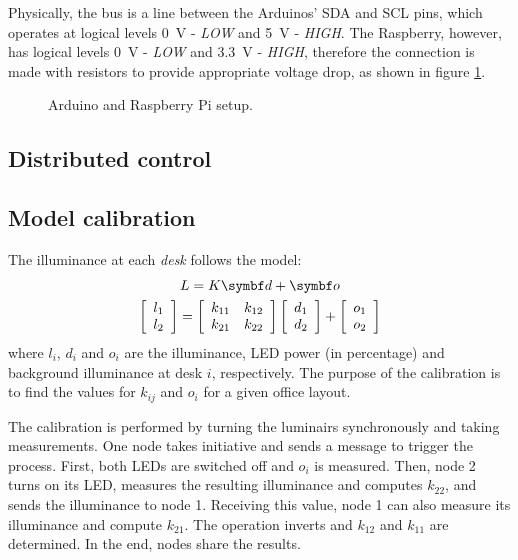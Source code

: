 \documentclass[english,fira]{ist-report}
\begin{document}
Physically, the bus is a line between the Arduinos' SDA and SCL pins, which operates at logical levels \SI{0}{\volt} - \textit{LOW} and \SI{5}{\volt} - \textit{HIGH}. 
The Raspberry, however, has logical levels \SI{0}{\volt} - \textit{LOW} and \SI{3.3}{\volt} - \textit{HIGH}, therefore the connection is made with resistors to provide appropriate voltage drop, as shown in figure \ref{fig:i2c}.

\begin{figure}[ht]
	\centering
	\resizebox{0.5\linewidth}{!}{}
	\caption{Arduino and Raspberry Pi setup.}
	\label{fig:i2c}
\end{figure}

\subsection{Distributed control} \label{sec:distr}

\subsection{Model calibration} \label{sec:calibration}

The illuminance at each \textit{desk} follows the model:
\begin{gather}
  L = K \matr{d} + \matr{o} \nonumber \\ 
  \left[\begin{array}{c} l_{1}\\ l_{2} \end{array}\right] =
  \left[\begin{array}{cc}
	k_{11} & k_{12}\\
	k_{21} & k_{22}
  \end{array}\right]
  \left[\begin{array}{c} d_{1}\\ d_{2}\end{array}\right]+
  \left[\begin{array}{c} o_{1}\\ o_{2} \end{array}\right]
  \label{eq:model}
\end{gather}
where $l_i$, $d_i$ and $o_i$ are the illuminance, LED power (in percentage) and background illuminance at desk $i$, respectively. The purpose of the calibration is to find the values for $k_{ij}$ and $o_i$ for a given office layout.

The calibration is performed by turning the luminairs synchronously and taking measurements. One node takes initiative and sends a message to trigger the process. First, both LEDs are switched off and $o_i$ is measured.
Then, node 2 turns on its LED, measures the resulting illuminance and computes $k_{22}$, and sends the illuminance to node 1. Receiving this value, node 1 can also measure its illuminance and compute $k_{21}$. The operation inverts and $k_{12}$ and $k_{11}$ are determined. In the end, nodes share the results.
\end{document}
